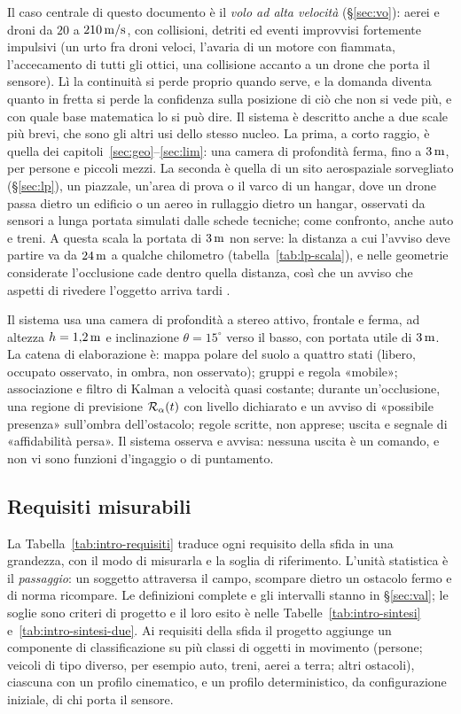 Il caso centrale di questo documento è il \emph{volo ad alta velocità} (\S\ref{sec:vo}): aerei e droni da $20$ a $210\,\mathrm{m/s}$, con collisioni, detriti ed eventi improvvisi fortemente impulsivi (un urto fra droni veloci, l'avaria di un motore con fiammata, l'accecamento di tutti gli ottici, una collisione accanto a un drone che porta il sensore). Lì la continuità si perde proprio quando serve, e la domanda diventa quanto in fretta si perde la confidenza sulla posizione di ciò che non si vede più, e con quale base matematica lo si può dire. Il sistema è descritto anche a due scale più brevi, che sono gli altri usi dello stesso nucleo. La prima, a corto raggio, è quella dei capitoli~\ref{sec:geo}--\ref{sec:lim}: una camera di profondità ferma, fino a $3\,\mathrm{m}$, per persone e piccoli mezzi. La seconda è quella di un sito aerospaziale sorvegliato (\S\ref{sec:lp}), un piazzale, un'area di prova o il varco di un hangar, dove un drone passa dietro un edificio o un aereo in rullaggio dietro un hangar, osservati da sensori a lunga portata simulati dalle schede tecniche; come confronto, anche auto e treni. A questa scala la portata di $3\,\mathrm{m}$ non serve: la distanza a cui l'avviso deve partire va da $24\,\mathrm{m}$ a qualche chilometro (tabella~\ref{tab:lp-scala}), e nelle geometrie considerate l'occlusione cade dentro quella distanza, così che un avviso che aspetti di rivedere l'oggetto arriva tardi .

Il sistema usa una camera di profondità a stereo attivo, frontale e ferma, ad altezza $h=1{,}2\,\mathrm{m}$ e inclinazione $\theta=15^\circ$ verso il basso, con portata utile di $3\,\mathrm{m}$. La catena di elaborazione è: mappa polare del suolo a quattro stati (libero, occupato osservato, in ombra, non osservato); gruppi e regola «mobile»; associazione e filtro di Kalman \cite{kalman1960} a velocità quasi costante; durante un'occlusione, una regione di previsione $\mathcal{R}_\alpha(t)$ con livello dichiarato e un avviso di «possibile presenza» sull'ombra dell'ostacolo; regole scritte, non apprese; uscita e segnale di «affidabilità persa». Il sistema osserva e avvisa: nessuna uscita è un comando, e non vi sono funzioni d'ingaggio o di puntamento.

\subsection{Requisiti misurabili}\label{sec:intro-requisiti}

La Tabella~\ref{tab:intro-requisiti} traduce ogni requisito della sfida in una grandezza, con il modo di misurarla e la soglia di riferimento. L'unità statistica è il \emph{passaggio}: un soggetto attraversa il campo, scompare dietro un ostacolo fermo e di norma ricompare. Le definizioni complete e gli intervalli stanno in \S\ref{sec:val}; le soglie sono criteri di progetto e il loro esito è nelle Tabelle~\ref{tab:intro-sintesi} e~\ref{tab:intro-sintesi-due}. Ai requisiti della sfida il progetto aggiunge un componente di classificazione su più classi di oggetti in movimento (persone; veicoli di tipo diverso, per esempio auto, treni, aerei a terra; altri ostacoli), ciascuna con un profilo cinematico, e un profilo deterministico, da configurazione iniziale, di chi porta il sensore.

